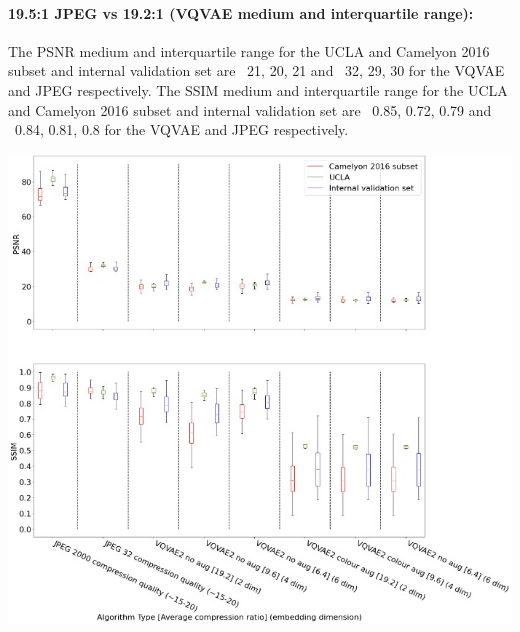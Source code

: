 \documentclass[review]{elsarticle}
\begin{document}
\paragraph{19.5:1 JPEG vs 19.2:1 (VQVAE medium and interquartile range):} The PSNR medium and interquartile range for the UCLA and Camelyon 2016 subset and internal validation set are ~21, 20, 21 and ~32, 29, 30 for the VQVAE and JPEG respectively.
The SSIM medium and interquartile range for the UCLA and Camelyon 2016 subset and internal validation set are ~0.85, 0.72, 0.79 and ~0.84, 0.81, 0.8 for the VQVAE and JPEG respectively.

\begin{center}
\includegraphics[width=1\linewidth]{Figures/VQVAE data augmentation PSNR SSIM comparison boxplot With JPEG and JPEG 2000.jpeg}
\end{center}
 
\end{document}
